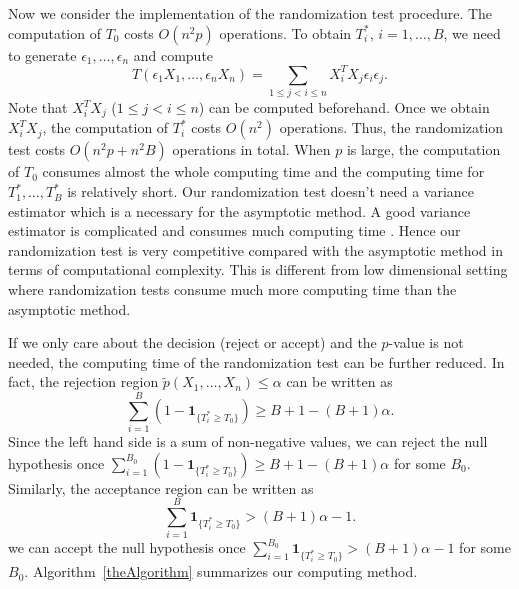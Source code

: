 \documentclass[review]{elsarticle}
\theoremstyle{plain}
\theoremstyle{definition}
\theoremstyle{remark}
\begin{document}
Now we consider the implementation of the randomization test procedure.
The computation of $T_0$ costs $O(n^2 p)$ operations.
To obtain $T_i^*$, $i=1,\ldots,B$, we need to generate $\epsilon_1,\ldots,\epsilon_n$ and compute
\begin{equation*}
T(\epsilon_1 X_1,\ldots,\epsilon_n X_n)
=\sum_{1\leq j<i \leq n}X_i^T X_j \epsilon_i \epsilon_j.
\end{equation*}
Note that $X_i^T X_j$ ($1\leq j<i\leq n$) can be computed beforehand.
Once we obtain $X_i^T X_j$, the computation of $T_i^*$ costs $O(n^2)$ operations.
Thus, the randomization test costs $O(n^2 p+n^2 B)$ operations in total.
When $p$ is large, the computation of $T_0$ consumes almost the whole computing time and the computing time for $T_1^*,\ldots,T_B^*$ is relatively short.
Our randomization test doesn't need a variance estimator which is a necessary for the asymptotic method. 
A good variance estimator is complicated and consumes much computing time  \citep{Chen2010A}.
Hence our randomization test is very competitive compared with the asymptotic method in terms of computational complexity.
This is different from low dimensional setting where randomization tests consume much more computing time than the asymptotic method.

If we only care about the decision (reject or accept) and the $p$-value is not needed, the computing time of the randomization test can be further reduced.
In fact, the rejection region $\tilde{p}(X_1,\ldots, X_n)\leq \alpha$ can be written as
\begin{equation*}
\sum_{i=1}^B (1-\mathbf{1}_{\{T_i^*\geq T_0\}})\geq B +1-(B+1)\alpha.
\end{equation*}
Since the left hand side is a sum of non-negative values, we can reject the null hypothesis once $\sum_{i=1}^{B_0} (1-\mathbf{1}_{\{T_i^*\geq T_0\}})\geq B +1-(B+1)\alpha$ for some $B_0$.
Similarly, the acceptance region can be written as
\begin{equation*}
\sum_{i=1}^B \mathbf{1}_{\{T_i^*\geq T_0\}}> (B+1)\alpha -1.
\end{equation*}
we can accept the null hypothesis once
$\sum_{i=1}^{B_0} \mathbf{1}_{\{T_i^*\geq T_0\}}> (B+1)\alpha -1$ for some $B_0$.
Algorithm~\ref{theAlgorithm} summarizes our computing method.
\end{document}

